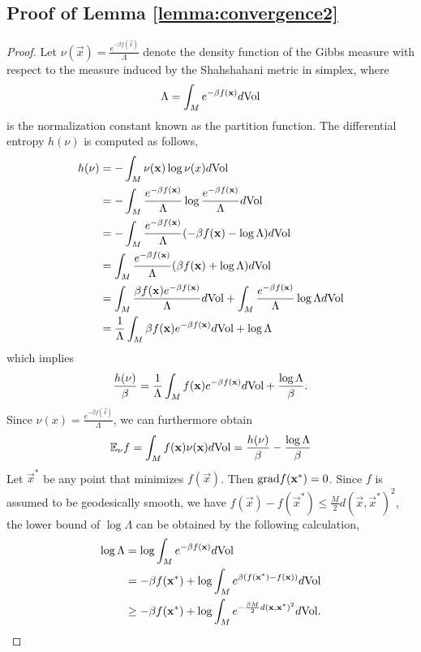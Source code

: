 \subsection{Proof of Lemma \ref{lemma:convergence2}}
\begin{proof}
Let $\nu(\vec{x})=\frac{e^{-\beta f(\vec{x})}}{\Lambda}$ denote the density function of the Gibbs measure with respect to the measure induced by the Shahshahani metric in simplex, where
\[
\Lambda = \int_Me^{-\beta f(\mathbf{x})}d\mathrm{Vol}
\]
is the normalization constant known as the partition function. The differential entropy $h(\nu)$ is computed as follows,
\begin{equation}
\begin{split}
h(\nu)&=-\int_M\nu(\mathbf{x})\log\nu(x)d\mathrm{Vol}
\\
&=-\int_M\frac{e^{-\beta f(\mathbf{x})}}{\Lambda}\log\frac{e^{-\beta f(\mathbf{x})}}{\Lambda}d\mathrm{Vol}
\\
&=-\int_M\frac{e^{-\beta f(\mathbf{x})}}{\Lambda}(-\beta f(\mathbf{x})-\log\Lambda)d\mathrm{Vol}
\\
&=\int_M\frac{e^{-\beta f(\mathbf{x})}}{\Lambda}(\beta f(\mathbf{x})+\log\Lambda)d\mathrm{Vol}
\\
&=\int_M\frac{\beta f(\mathbf{x})e^{-\beta f(\mathbf{x})}}{\Lambda}d\mathrm{Vol}+\int_M\frac{e^{-\beta f(\mathbf{x})}}{\Lambda}\log\Lambda d\mathrm{Vol}
\\
&=\frac{1}{\Lambda}\int_M\beta f(\mathbf{x})e^{-\beta f(\mathbf{x})}d\mathrm{Vol}+\log\Lambda
\end{split}
\end{equation} 
which implies
\[
\frac{h(\nu)}{\beta}=\frac{1}{\Lambda}\int_Mf(\mathbf{x})e^{-\beta f(\mathbf{x})}d\mathrm{Vol}+\frac{\log\Lambda}{\beta}.
\]
Since $\nu(x)=\frac{e^{-\beta f(\vec{x})}}{\Lambda}$, we can furthermore obtain 
\[
\mathbb{E}_{\nu}f=\int_Mf(\mathbf{x})\nu(\mathbf{x})d\mathrm{Vol}=\frac{h(\nu)}{\beta}-\frac{\log\Lambda}{\beta}
\]
Let $\vec{x}^*$ be any point that minimizes $f(\vec{x})$. Then $\mathrm{grad} f(\mathbf{x}^*)=0$. Since $f$ is assumed to be geodesically smooth, we have $f(\vec{x})-f(\vec{x}^*)\le\frac{M}{2}d(\vec{x},\vec{x}^*)^2$, the lower bound of $\log\Lambda$ can be obtained by the following calculation,
\begin{equation}
\begin{split}
\log\Lambda&=\log\int_Me^{-\beta f(\vec{x})}d\vol
\\
&=-\beta f(\vec{x}^*)+\log\int_Me^{\beta (f(\vec{x}^*)-f(\vec{x}))}d\vol
\\
&\ge -\beta f(\vec{x}^*)+\log\int_Me^{-\frac{\beta M}{2}d(\vec{x},\vec{x}^*)^2}d\vol.
\end{split}

\end{equation}
\end{proof}
